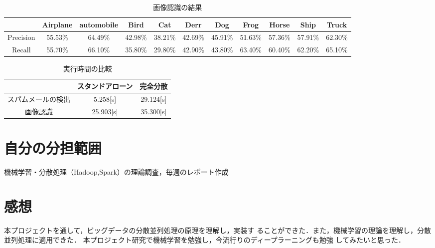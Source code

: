 \documentclass[a4paper,12pt]{jarticle}
\begin{document}
%
%
\begin{table}[h]
\centering
\caption{画像認識の結果}
 \label{tab:image_result}
\fontsize{8pt}{9pt}\selectfont
 \begin{tabular}{c|c|c|c|c|c|c|c|c|c|c} \hline
  &Airplane&automobile&Bird&Cat&Derr&Dog&Frog&Horse&Ship&Truck \\ \hline
Precision&55.53\% & 64.49\% & 42.98\% & 38.21\%& 42.69\% & 45.91\% & 51.63\% & 57.36\% & 57.91\% & 62.30\% \\ \hline
 Recall&55.70\% & 66.10\% & 35.80\% & 29.80\% &42.90\% & 43.80\% &63.40\% & 60.40\% & 62.20\% & 65.10\%  \\ \hline
\end{tabular}
\end{table}
%
\begin{table}[h]
\centering
\caption{実行時間の比較}
\label{tab:time}
\fontsize{9pt}{10pt}\selectfont
\begin{tabular}{c||c|c} \hline
&スタンドアローン&完全分散 \\\hline \hline 
スパムメールの検出& 5.258[s]& 29.124[s]  \\ \hline
画像認識&25.903[s]& 35.300[s]   \\ \hline
\end{tabular}
\end{table}
%
\section{自分の分担範囲}
機械学習・分散処理（Hadoop,Spark）の理論調査，毎週のレポート作成
\section{感想}
本プロジェクトを通して，ビッグデータの分散並列処理の原理を理解し，実装す
ることができた．また，機械学習の理論を理解し，分散並列処理に適用できた．
本プロジェクト研究で機械学習を勉強し，今流行りのディープラーニングも勉強
してみたいと思った．
\newpage
\end{document}
